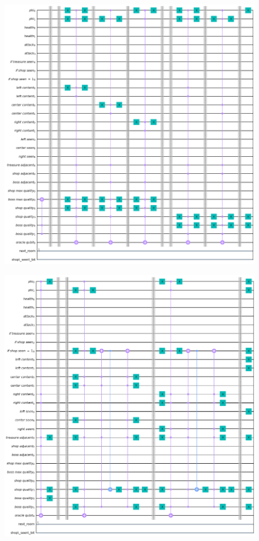 \documentclass{book}
\theoremstyle{definition}
\theoremstyle{definition}
\theoremstyle{definition}
\theoremstyle{plain}
\theoremstyle{plain}
\theoremstyle{plain}
\theoremstyle{plain}
\begin{document}
\begin{figure}[H]
\begin{center}
    \includegraphics[width=16cm]{immagini_circuito_8_stanze/mega_circ_8.png}
\end{center}
\end{figure}

\begin{figure}[H]
\begin{center}
    \includegraphics[width=16cm]{immagini_circuito_8_stanze/mega_circ_9.png}
\end{center}
\end{figure}
\end{document}
